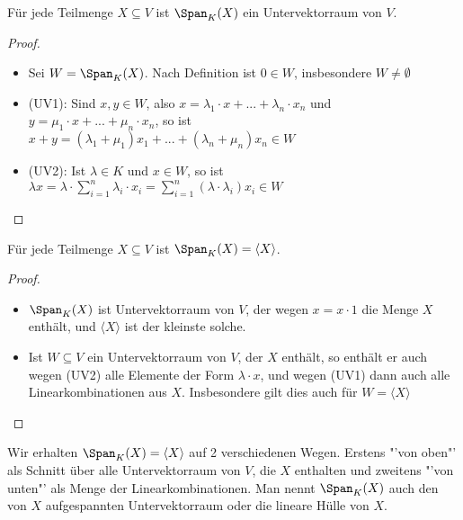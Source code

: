 \begin{lemma}
	Für jede Teilmenge $X \subseteq V$ ist $\Span_K(X)$ ein Untervektorraum von $V$.
\end{lemma}
\begin{proof}
	\begin{itemize}
		\item Sei $W=\Span_K(X)$. Nach Definition ist $0 \in W$, insbesondere $W\neq\emptyset$
		\item (UV1): Sind $x,y \in W$, also $x=\lambda_1\cdot x+...+\lambda_n\cdot x_n$ und $y=\mu_1\cdot x+...+
		\mu_n\cdot x_n$, so ist $x+y=(\lambda_1+\mu_1)x_1+...+(\lambda_n+\mu_n)x_n \in W$
		\item (UV2): Ist $\lambda \in K$ und $x \in W$, so ist $\lambda x=\lambda\cdot\sum_{i=1}^n \lambda_i\cdot x_i=
		\sum_{i=1}^n (\lambda\cdot\lambda_i)x_i \in W$
	\end{itemize}
\end{proof}

\begin{proposition}
	Für jede Teilmenge $X \subseteq V$ ist $\Span_K(X)=\langle X\rangle$.
\end{proposition}
\begin{proof}
	\begin{itemize}
		\item $\Span_K(X)$ ist Untervektorraum von $V$, der wegen $x=x\cdot 1$ die Menge $X$ enthält, und $\langle X\rangle$ ist der kleinste solche.
		\item Ist $W\subseteq V$ ein Untervektorraum von $V$, der $X$ enthält, so enthält er auch wegen (UV2) alle Elemente der Form 
		$\lambda\cdot x$, und wegen (UV1) dann auch alle Linearkombinationen aus $X$. Insbesondere gilt dies auch für $W=\langle X\rangle$
	\end{itemize}
\end{proof}

\begin{remark}
	Wir erhalten $\Span_K(X)=\langle X\rangle$ auf 2 verschiedenen Wegen. Erstens "'von oben"' als Schnitt über alle Untervektorraum 
	von $V$, die $X$ enthalten und zweitens "'von unten"' als Menge der Linearkombinationen. Man nennt $\Span_K(X)$ auch den 
	von $X$ aufgespannten Untervektorraum oder die lineare Hülle von $X$.
\end{remark}

